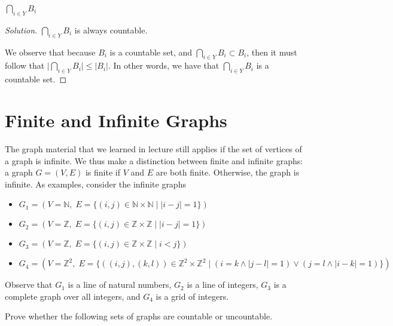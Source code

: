\documentclass{article}
\newenvironment{solution}{\begin{proof}[Solution]}{\end{proof}}
\newcommand{\NN}{\mathbb{N}}
\begin{document}
\begin{hw}
	$\bigcap_{i \in Y} B_i$
\end{hw}
\begin{solution}
%	
%	

	$\bigcap_{i \in Y} B_{i}$ is always countable.
	
	We observe that because $B_{i}$ is a countable set, and $\bigcap_{i \in Y} B_{i} \subset B_{i}$, then it must follow that $\lvert \bigcap_{i \in Y} B_{i} \rvert \leq \lvert B_{i} \rvert$. In other words, we have that $\bigcap_{i \in Y} B_{i}$ is a countable set.
\end{solution}

\newpage

\section{Finite and Infinite Graphs}
The graph material that we learned in lecture still applies if the set of vertices of a graph is infinite. We thus make a distinction between finite and infinite graphs: a graph $G= (V,E)$ is finite if $V$ and $E$ are both finite. Otherwise, the graph is infinite. As examples, consider the infinite graphs 
\begin{itemize}
	\item $G_1 = (V=\mathbb{N},\; E=\{(i,j)\in \mathbb{N}\times \mathbb{N} \mid |i-j|=1\})$
	\item $G_2 = (V=\mathbb{Z},\; E=\{(i,j)\in \mathbb{Z}\times \mathbb{Z} \mid |i-j|=1\})$
	\item $G_3 = (V=\mathbb{Z},\; E=\{(i,j)\in \mathbb{Z}\times \mathbb{Z} \mid i<j\})$
	\item $G_4 = (V=\mathbb{Z}^2,\; E=\{((i,j),(k,l))\in \mathbb{Z}^2\times \mathbb{Z}^2 \mid (i=k \land |j-l|=1) \lor (j=l \land |i-k|=1)\})$
\end{itemize}
Observe that $G_1$ is a line of natural numbers, $G_2$ is a line of integers, $G_3$ is a complete graph over all integers, and $G_4$ is a grid of integers.

Prove whether the following sets of graphs are countable or uncountable.
\end{document}
